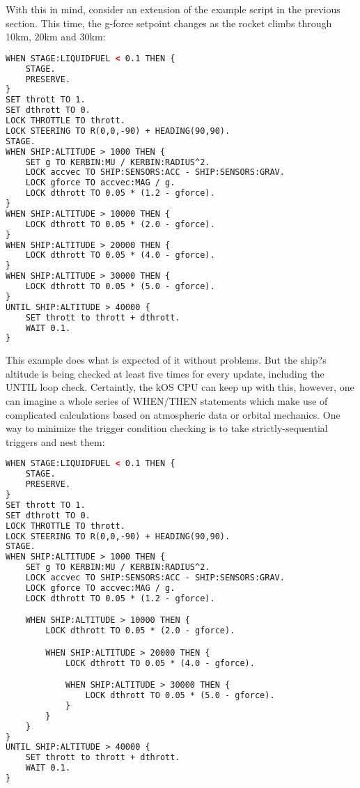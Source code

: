 With this in mind, consider an extension of the example script in the previous section. This time, the g-force setpoint changes as the rocket climbs through 10km, 20km and 30km:

\begin{lstlisting}[frame=single,language=XML]
WHEN STAGE:LIQUIDFUEL < 0.1 THEN {
    STAGE.
    PRESERVE.
}
SET thrott TO 1.
SET dthrott TO 0.
LOCK THROTTLE TO thrott.
LOCK STEERING TO R(0,0,-90) + HEADING(90,90).
STAGE.
WHEN SHIP:ALTITUDE > 1000 THEN {
    SET g TO KERBIN:MU / KERBIN:RADIUS^2.
    LOCK accvec TO SHIP:SENSORS:ACC - SHIP:SENSORS:GRAV.
    LOCK gforce TO accvec:MAG / g.
    LOCK dthrott TO 0.05 * (1.2 - gforce).
}
WHEN SHIP:ALTITUDE > 10000 THEN {
    LOCK dthrott TO 0.05 * (2.0 - gforce).
}
WHEN SHIP:ALTITUDE > 20000 THEN {
    LOCK dthrott TO 0.05 * (4.0 - gforce).
}
WHEN SHIP:ALTITUDE > 30000 THEN {
    LOCK dthrott TO 0.05 * (5.0 - gforce).
}
UNTIL SHIP:ALTITUDE > 40000 {
    SET thrott to thrott + dthrott.
    WAIT 0.1.
}
\end{lstlisting} 

This example does what is expected of it without problems. But the ship?s altitude is being checked at least five times for every update, including the UNTIL loop check. Certaintly, the kOS CPU can keep up with this, however, one can imagine a whole series of WHEN/THEN statements which make use of complicated calculations based on atmospheric data or orbital mechanics. One way to minimize the trigger condition checking is to take strictly-sequential triggers and nest them:

\begin{lstlisting}[frame=single,language=XML]
WHEN STAGE:LIQUIDFUEL < 0.1 THEN {
    STAGE.
    PRESERVE.
}
SET thrott TO 1.
SET dthrott TO 0.
LOCK THROTTLE TO thrott.
LOCK STEERING TO R(0,0,-90) + HEADING(90,90).
STAGE.
WHEN SHIP:ALTITUDE > 1000 THEN {
    SET g TO KERBIN:MU / KERBIN:RADIUS^2.
    LOCK accvec TO SHIP:SENSORS:ACC - SHIP:SENSORS:GRAV.
    LOCK gforce TO accvec:MAG / g.
    LOCK dthrott TO 0.05 * (1.2 - gforce).

    WHEN SHIP:ALTITUDE > 10000 THEN {
        LOCK dthrott TO 0.05 * (2.0 - gforce).

        WHEN SHIP:ALTITUDE > 20000 THEN {
            LOCK dthrott TO 0.05 * (4.0 - gforce).

            WHEN SHIP:ALTITUDE > 30000 THEN {
                LOCK dthrott TO 0.05 * (5.0 - gforce).
            }
        }
    }
}
UNTIL SHIP:ALTITUDE > 40000 {
    SET thrott to thrott + dthrott.
    WAIT 0.1.
}
\end{lstlisting} 

